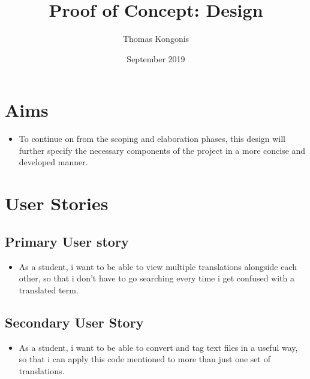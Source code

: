 \documentclass{article}
\title{Proof of Concept: Design}
\author{Thomas Kongonis}
\date{September 2019}
\begin{document}
\maketitle

\tableofcontents

\section{Aims}

\begin{itemize}

\item{To continue on from the scoping and elaboration phases, this design will further specify the necessary components of the project in a more concise and developed manner.}

\end{itemize}



\section{User Stories}


\subsection{Primary User story}

\begin{itemize}
\item{As a student, i want to be able to view multiple translations alongside each other, so that i don't have to go searching every time i get confused with a translated term.} 

\end{itemize}


\subsection{Secondary User Story}

\begin{itemize}

\item{As a student, i want to be able to convert and tag text files in a useful way, so that i can apply this code mentioned to more than just one set of translations.}
    
    
    
\end{itemize}
\end{document}
